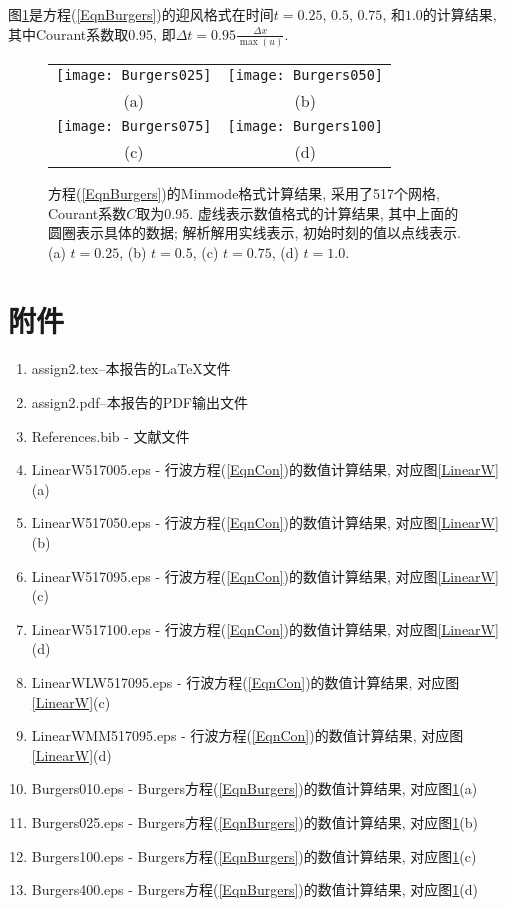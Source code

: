 \documentclass[10.5pt
]{article}
\begin{document}
图\ref{BurgersW}是方程(\ref{EqnBurgers})的迎风格式在时间$t = 0.25$, $0.5$, $0.75$, 和$1.0$的计算结果, 其中Courant系数取0.95, 即$\Delta t = 0.95 \frac{\Delta x}{\max(u)}$.
\begin{figure}
\begin{center}
\begin{tabular}{cc}
\texttt{[image: Burgers025]}
&
\texttt{[image: Burgers050]}
\\[-10pt]
(a) & (b)
\\
\texttt{[image: Burgers075]}
&
\texttt{[image: Burgers100]}
\\[-10pt]
(c) & (d)
\end{tabular}
\end{center}
\caption{%
方程(\ref{EqnBurgers})的Minmode格式计算结果, 采用了517个网格, Courant系数$C$取为0.95. 虚线表示数值格式的计算结果, 其中上面的圆圈表示具体的数据; 解析解用实线表示, 初始时刻的值以点线表示. (a) $t=0.25$, (b) $t=0.5$, (c) $t=0.75$, (d) $t=1.0$.
}
\label{BurgersW}
\end{figure}

\section*{附件}

\begin{enumerate}
\item
assign2.tex--本报告的\LaTeX 文件
\item
assign2.pdf--本报告的PDF输出文件
\item
References.bib - 文献文件
\item
LinearW517005.eps - 行波方程(\ref{EqnCon})的数值计算结果, 对应图\ref{LinearW}(a)
\item
LinearW517050.eps - 行波方程(\ref{EqnCon})的数值计算结果, 对应图\ref{LinearW}(b)
\item
LinearW517095.eps - 行波方程(\ref{EqnCon})的数值计算结果, 对应图\ref{LinearW}(c)
\item
LinearW517100.eps - 行波方程(\ref{EqnCon})的数值计算结果, 对应图\ref{LinearW}(d)
\item
LinearWLW517095.eps - 行波方程(\ref{EqnCon})的数值计算结果, 对应图\ref{LinearW}(c)
\item
LinearWMM517095.eps - 行波方程(\ref{EqnCon})的数值计算结果, 对应图\ref{LinearW}(d)
\item
Burgers010.eps - Burgers方程(\ref{EqnBurgers})的数值计算结果, 对应图\ref{BurgersW}(a)
\item
Burgers025.eps - Burgers方程(\ref{EqnBurgers})的数值计算结果, 对应图\ref{BurgersW}(b)
\item
Burgers100.eps - Burgers方程(\ref{EqnBurgers})的数值计算结果, 对应图\ref{BurgersW}(c)
\item
Burgers400.eps - Burgers方程(\ref{EqnBurgers})的数值计算结果, 对应图\ref{BurgersW}(d)
\end{enumerate}
\end{document}
